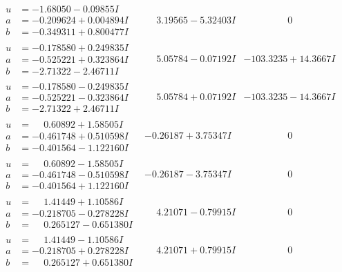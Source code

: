 \documentclass[1p]{elsarticle_modified}
\theoremstyle{definition}
\begin{document}
$$\begin{array}{c|c|c}
\begin{aligned}
u &= -1.68050 - 0.09855 I \\
a &= -0.209624 + 0.004894 I \\
b &= -0.349311 + 0.800477 I\end{aligned}
 & \phantom{-}3.19565 - 5.32403 I & \phantom{-0.000000 } 0 \\ \hline\begin{aligned}
u &= -0.178580 + 0.249835 I \\
a &= -0.525221 + 0.323864 I \\
b &= -2.71322 - 2.46711 I\end{aligned}
 & \phantom{-}5.05784 - 0.07192 I & -103.3235 + 14.3667 I \\ \hline\begin{aligned}
u &= -0.178580 - 0.249835 I \\
a &= -0.525221 - 0.323864 I \\
b &= -2.71322 + 2.46711 I\end{aligned}
 & \phantom{-}5.05784 + 0.07192 I & -103.3235 - 14.3667 I \\ \hline\begin{aligned}
u &= \phantom{-}0.60892 + 1.58505 I \\
a &= -0.461748 + 0.510598 I \\
b &= -0.401564 - 1.122160 I\end{aligned}
 & -0.26187 + 3.75347 I & \phantom{-0.000000 } 0 \\ \hline\begin{aligned}
u &= \phantom{-}0.60892 - 1.58505 I \\
a &= -0.461748 - 0.510598 I \\
b &= -0.401564 + 1.122160 I\end{aligned}
 & -0.26187 - 3.75347 I & \phantom{-0.000000 } 0 \\ \hline\begin{aligned}
u &= \phantom{-}1.41449 + 1.10586 I \\
a &= -0.218705 - 0.278228 I \\
b &= \phantom{-}0.265127 - 0.651380 I\end{aligned}
 & \phantom{-}4.21071 - 0.79915 I & \phantom{-0.000000 } 0 \\ \hline\begin{aligned}
u &= \phantom{-}1.41449 - 1.10586 I \\
a &= -0.218705 + 0.278228 I \\
b &= \phantom{-}0.265127 + 0.651380 I\end{aligned}
 & \phantom{-}4.21071 + 0.79915 I & \phantom{-0.000000 } 0 \\ \hline\begin{aligned}

\end{aligned}
\end{array}$$
\end{document}
